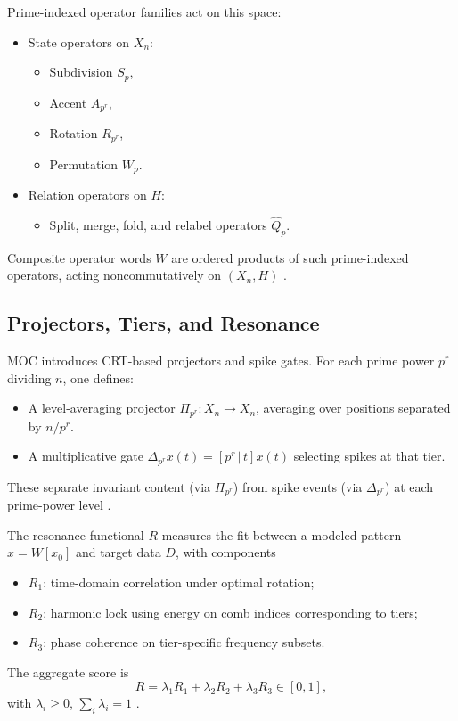 \documentclass[11pt]{article}
\begin{document}
Prime-indexed operator families act on this space:
\begin{itemize}[leftmargin=1.5em]
  \item State operators on \(X_n\):
  \begin{itemize}
    \item Subdivision \(S_p\),
    \item Accent \(A_{p^r}\),
    \item Rotation \(R_{p^r}\),
    \item Permutation \(W_p\).
  \end{itemize}
  \item Relation operators on \(H\):
  \begin{itemize}
    \item Split, merge, fold, and relabel operators \(\hat Q_p\).
  \end{itemize}
\end{itemize}
Composite operator words \(W\) are ordered products of such prime-indexed
operators, acting noncommutatively on \((X_n,H)\) \cite{MOC}.

\subsection{Projectors, Tiers, and Resonance}

MOC introduces CRT-based projectors and spike gates. For each prime power
\(p^r\) dividing \(n\), one defines:
\begin{itemize}[leftmargin=1.5em]
  \item A level-averaging projector \(\Pi_{p^r}:X_n\to X_n\), averaging over
  positions separated by \(n/p^r\).
  \item A multiplicative gate \(\Delta_{p^r} x(t) = [p^r\,|\,t] x(t)\)
  selecting spikes at that tier.
\end{itemize}
These separate invariant content (via \(\Pi_{p^r}\)) from spike events (via
\(\Delta_{p^r}\)) at each prime-power level \cite{MOC}.

The resonance functional \(R\) measures the fit between a modeled pattern
\(x=W[x_0]\) and target data \(D\), with components
\begin{itemize}[leftmargin=1.5em]
  \item \(R_1\): time-domain correlation under optimal rotation;
  \item \(R_2\): harmonic lock using energy on comb indices corresponding to
  tiers;
  \item \(R_3\): phase coherence on tier-specific frequency subsets.
\end{itemize}
The aggregate score is
\[
  R = \lambda_1 R_1 + \lambda_2 R_2 + \lambda_3 R_3 \in [0,1],
\]
with \(\lambda_i \ge 0\), \(\sum_i \lambda_i=1\) \cite{MOC}.
\end{document}
